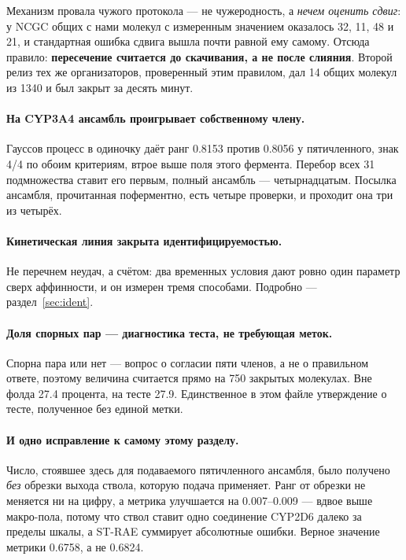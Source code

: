 Механизм провала чужого протокола --- не чужеродность, а \emph{нечем оценить сдвиг}: у NCGC общих с
нами молекул с измеренным значением оказалось 32, 11, 48 и 21, и стандартная ошибка сдвига вышла почти
равной ему самому. Отсюда правило: \textbf{пересечение считается до скачивания, а не после слияния}.
Второй релиз тех же организаторов, проверенный этим правилом, дал 14 общих молекул из 1340 и был
закрыт за десять минут.

\paragraph{На CYP3A4 ансамбль проигрывает собственному члену.} Гауссов процесс в одиночку даёт ранг
0.8153 против 0.8056 у пятичленного, знак 4/4 по обоим критериям, втрое выше поля этого фермента.
Перебор всех 31 подмножества ставит его первым, полный ансамбль --- четырнадцатым. Посылка ансамбля,
прочитанная поферментно, есть четыре проверки, и проходит она три из четырёх.

\paragraph{Кинетическая линия закрыта идентифицируемостью.} Не перечнем неудач, а счётом: два
временных условия дают ровно один параметр сверх аффинности, и он измерен тремя способами.
Подробно --- раздел~\ref{sec:ident}.

\paragraph{Доля спорных пар --- диагностика теста, не требующая меток.} Спорна пара или нет --- вопрос
о согласии пяти членов, а не о правильном ответе, поэтому величина считается прямо на 750 закрытых
молекулах. Вне фолда 27.4 процента, на тесте 27.9. Единственное в этом файле утверждение о тесте,
полученное без единой метки.

\paragraph{И одно исправление к самому этому разделу.} Число, стоявшее здесь для подаваемого
пятичленного ансамбля, было получено \emph{без} обрезки выхода ствола, которую подача применяет.
Ранг от обрезки не меняется ни на цифру, а метрика улучшается на 0.007--0.009 --- вдвое выше
макро-пола, потому что ствол ставит одно соединение CYP2D6 далеко за пределы шкалы, а ST-RAE
суммирует абсолютные ошибки. Верное значение метрики 0.6758, а не 0.6824.
